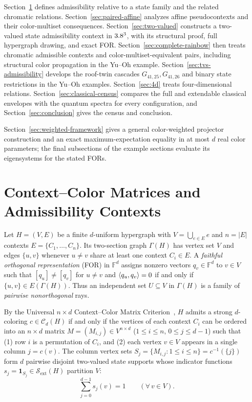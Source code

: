 \documentclass[aps,pra,reprint,superscriptaddress,longbibliography,nofootinbib,floatfix,10pt]{revtex4-2}
\theoremstyle{definition}\newtheorem{definition}[theorem]{Definition}
\theoremstyle{remark}\newtheorem{remark}[theorem]{Remark}
\newcommand{\F}{\mathbb F}\newcommand{\Z}{\mathbb Z}\newcommand{\PP}{\mathbb P}
\newcommand{\Sc}{\mathcal S}\newcommand{\Cc}{\mathcal C}\newcommand{\Wc}{\mathcal W}
\begin{document}
Section~\ref{sec:framework} defines admissibility relative to a state family and the related chromatic relations. Section~\ref{sec:paired-affine} analyzes affine pseudocontexts and their color-multiset consequences. Section~\ref{sec:two-valued} constructs a two-valued state admissibility context in $3.8^3$, with its structural proof, full hypergraph drawing, and exact FOR. Section~\ref{sec:complete-rainbow} then treats chromatic admissible contexts and color-multiset-equivalent pairs, including structural color propagation in the Yu--Oh example. Section~\ref{sec:tvs-admissibility} develops the roof-twin cascades $G_{41,25},G_{41,26}$ and binary state restrictions in the Yu--Oh examples. Section~\ref{sec:4d} treats four-dimensional relations. Section~\ref{sec:classical-census} compares the full and extendable classical envelopes with the quantum spectra for every configuration, and Section~\ref{sec:conclusion} gives the census and conclusion.

Section~\ref{sec:weighted-framework} gives a general color-weighted projector construction and an exact maximum-expectation equality in at most $d$ real color parameters; the final subsections of the example sections evaluate its eigensystems for the stated FORs.

\section{Context--Color Matrices and Admissibility Contexts}\label{sec:framework}

Let $H=(V,E)$ be a finite $d$-uniform hypergraph with $V=\bigcup_{e\in E}e$ and $n=|E|$ contexts $E=\{C_1,\ldots,C_n\}$. Its two-section graph $\Gamma(H)$ has vertex set $V$ and edges $\{u,v\}$ whenever $u\neq v$ share at least one context $C_i\in E$. A \emph{faithful orthogonal representation} (FOR) in $\F^d$ assigns nonzero vectors $q_v\in\F^d$ to $v\in V$ such that $[q_u]\neq[q_v]$ for $u\neq v$ and $\langle q_u,q_v\rangle=0$ if and only if $\{u,v\}\in E(\Gamma(H))$. Thus an independent set $U\subseteq V$ in $\Gamma(H)$ is a family of \emph{pairwise nonorthogonal} rays.

By the Universal $n\times d$ Context--Color Matrix Criterion~\cite[Theorem~1]{2026-latin-context-matrix}, $H$ admits a strong $d$-coloring $c\in\Cc_d(H)$ if and only if the vertices of each context $C_i$ can be ordered into an $n\times d$ matrix $M=(M_{i,j})\in V^{n\times d}$ ($1\le i\le n$, $0\le j\le d-1$) such that (1) row $i$ is a permutation of $C_i$, and (2) each vertex $v\in V$ appears in a single column $j=c(v)$. The column vertex sets $S_j=\{M_{i,j}:1\le i\le n\}=c^{-1}(\{j\})$ form $d$ pairwise disjoint two-valued state supports whose indicator functions $s_j=\mathbf{1}_{S_j}\in\Sc_{\mathrm{ext}}(H)$ partition $V$:
\begin{equation}\label{eq:color-class-partition}
\sum_{j=0}^{d-1} s_j(v) = 1 \qquad (\forall\, v\in V).
\end{equation}
\end{document}
